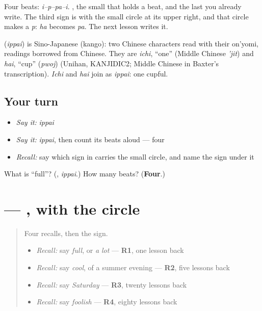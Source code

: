 Four beats: \emph{i–p–pa–i}. \textbf{}, the small \textbf{} that holds a beat, and the last \textbf{} you already write. The third sign is \textbf{} with the small circle at its upper right, and that circle makes a \emph{p}: \emph{ha} becomes \emph{pa}. The next lesson writes it.

\begin{cousinweb}
\textbf{} (\emph{ippai}) is Sino-Japanese (kango): two Chinese characters read with their on'yomi, readings borrowed from Chinese. They are \emph{ichi}, \textquotedblleft{}one\textquotedblright{} (Middle Chinese \emph{'jit}) and \emph{hai}, \textquotedblleft{}cup\textquotedblright{} (\emph{pwoj}) (Unihan, KANJIDIC2; Middle Chinese in Baxter's transcription). \emph{Ichi} and \emph{hai} join as \emph{ippai}: one cupful.
\end{cousinweb}

\subsection*{Your turn}
\begin{itemize}
\raggedright
  \item \emph{Say it:} \emph{ippai}
  \item \emph{Say it:} \emph{ippai}, then count its beats aloud — four
  \item \emph{Recall:} say which sign in \textbf{} carries the small circle, and name the sign under it
\end{itemize}

\begin{tcolorbox}[breakable,colback=teal!4,colframe=teal!35!black,title={Before you move on}]
What is \textquotedblleft{}full\textquotedblright{}? (\textbf{}, \emph{ippai}.) How many beats? (\textbf{Four}.)
\end{tcolorbox}
\section[\texorpdfstring{\ja{ぱ} (pa)}{ぱ (pa)}]{ — , with the circle}

\label{lesson:JA-W137-pa}



\begin{quote}
Four recalls, then the sign.

\begin{itemize}
\raggedright
  \item \emph{Recall:} say \emph{full}, or \emph{a lot} — \textbf{R1}, one lesson back
  \item \emph{Recall:} say \emph{cool}, of a summer evening — \textbf{R2}, five lessons back
  \item \emph{Recall:} say \emph{Saturday} — \textbf{R3}, twenty lessons back
  \item \emph{Recall:} say \emph{foolish} — \textbf{R4}, eighty lessons back
\end{itemize}
\end{quote}

